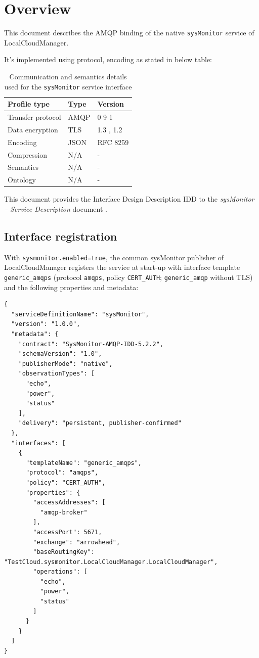 \documentclass[a4paper]{arrowhead}
\begin{document}
\section{Overview}
\label{sec:overview}

This document describes the AMQP binding of the native \texttt{sysMonitor} service of LocalCloudManager.

It's implemented using protocol, encoding as stated in below table:
\begin{table}[ht!]
  \centering
  \begin{tabular}{|l|l|l|}
    \hline
    \rowcolor{gray!33} Profile type & Type & Version \\ \hline
    Transfer protocol & AMQP & 0-9-1 \cite{amqp091} \\ \hline
    Data encryption & TLS & 1.3 \cite{rfc8446}, 1.2 \cite{rfc5246} \\ \hline
    Encoding & JSON & RFC 8259 \cite{rfc8259} \\ \hline
    Compression & N/A & - \\ \hline
    Semantics & N/A & - \\ \hline
    Ontology & N/A & - \\ \hline
  \end{tabular}
  \caption{Communication and semantics details used for the \texttt{sysMonitor} service interface}
  \label{tab:comunication_semantics_profile}
\end{table}

This document provides the Interface Design Description IDD to the \textit{sysMonitor -- Service Description} document \cite{lcm-sysMonitor-sd}.

\subsection{Interface registration}

With \texttt{sysmonitor.enabled=true}, the common sysMonitor publisher of LocalCloudManager registers the service at start-up with interface template \texttt{generic\_\allowbreak{}amqps} (protocol \texttt{amqps}, policy \texttt{CERT\_\allowbreak{}AUTH}; \texttt{generic\_\allowbreak{}amqp} without TLS) and the following properties and metadata:

\begin{lstlisting}[caption={Registered service instance (TestCloud).}]
{
  "serviceDefinitionName": "sysMonitor",
  "version": "1.0.0",
  "metadata": {
    "contract": "SysMonitor-AMQP-IDD-5.2.2",
    "schemaVersion": "1.0",
    "publisherMode": "native",
    "observationTypes": [
      "echo",
      "power",
      "status"
    ],
    "delivery": "persistent, publisher-confirmed"
  },
  "interfaces": [
    {
      "templateName": "generic_amqps",
      "protocol": "amqps",
      "policy": "CERT_AUTH",
      "properties": {
        "accessAddresses": [
          "amqp-broker"
        ],
        "accessPort": 5671,
        "exchange": "arrowhead",
        "baseRoutingKey": "TestCloud.sysmonitor.LocalCloudManager.LocalCloudManager",
        "operations": [
          "echo",
          "power",
          "status"
        ]
      }
    }
  ]
}
\end{lstlisting}
\end{document}

